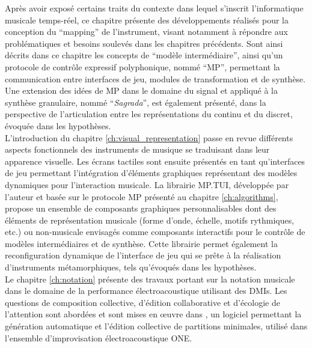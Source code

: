 \indent Après avoir exposé certains traits du contexte dans lequel s'inscrit l'informatique musicale temps-réel, ce chapitre présente des développements réalisés pour la conception du ``mapping'' de l'instrument, visant notamment à répondre aux problématiques et besoins soulevés dans les chapitres précédents. Sont ainsi décrits dans ce chapitre les concepts de ``modèle intermédiaire'', ainsi qu'un protocole de contrôle expressif polyphonique, nommé ``MP'', permettant la communication entre interfaces de jeu, modules de transformation et de synthèse. Une extension des idées de MP dans le domaine du signal et appliqué à la synthèse granulaire, nommé ``\textit{Sagrada}'', est également présenté, dans la perspective de l'articulation entre les représentations du continu et du discret, évoquée dans les hypothèses.\\
\indent L'introduction du chapitre \ref{ch:visual_representation} passe en revue différents aspects fonctionnels des instruments de musique se traduisant dans leur apparence visuelle. Les écrans tactiles sont ensuite présentés en tant qu'interfaces de jeu permettant l'intégration d'éléments graphiques représentant des modèles dynamiques pour l'interaction musicale. La librairie MP.TUI, développée par l'auteur et basée sur le protocole MP présenté au chapitre  \ref{ch:algorithms}, propose un ensemble de composants graphiques personnalisables dont des éléments de représentation musicale (forme d'onde, échelle, motifs rythmiques, etc.) ou non-musicale envisagés comme composants interactifs pour le contrôle de modèles intermédiaires et de synthèse. Cette librairie permet également la reconfiguration dynamique de l'interface de jeu qui se prête à la réalisation d'instruments métamorphiques, tels qu'évoqués dans les hypothèses.\\
\indent Le chapitre \ref{ch:notation} présente des travaux portant sur la notation musicale dans le domaine de la performance électroacoustique utilisant des \glspl{DMI}. Les questions de composition collective, d'édition collaborative et d'écologie de l'attention sont abordées et sont mises en œuvre dans , un logiciel permettant la génération automatique et l'édition collective de partitions minimales, utilisé dans l'ensemble d'improvisation électroacoustique ONE. 

